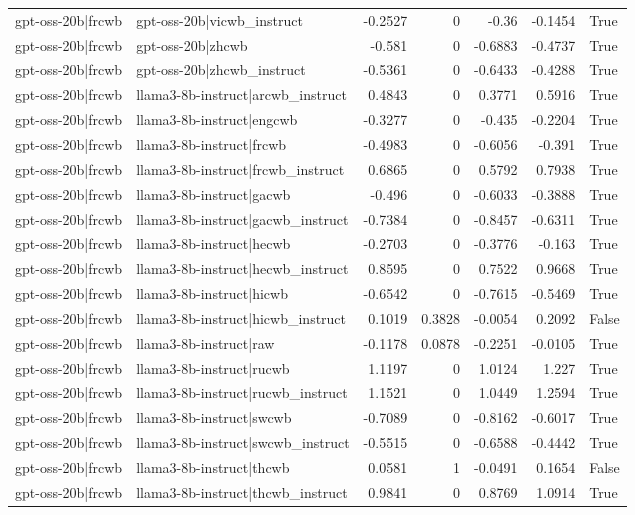 \begin{table}
\begin{tabular}{l l r r r r l}
gpt-oss-20b|frcwb & gpt-oss-20b|vicwb_instruct & -0.2527 & 0 & -0.36 & -0.1454 & True \\
gpt-oss-20b|frcwb & gpt-oss-20b|zhcwb & -0.581 & 0 & -0.6883 & -0.4737 & True \\
gpt-oss-20b|frcwb & gpt-oss-20b|zhcwb_instruct & -0.5361 & 0 & -0.6433 & -0.4288 & True \\
gpt-oss-20b|frcwb & llama3-8b-instruct|arcwb_instruct & 0.4843 & 0 & 0.3771 & 0.5916 & True \\
gpt-oss-20b|frcwb & llama3-8b-instruct|engcwb & -0.3277 & 0 & -0.435 & -0.2204 & True \\
gpt-oss-20b|frcwb & llama3-8b-instruct|frcwb & -0.4983 & 0 & -0.6056 & -0.391 & True \\
gpt-oss-20b|frcwb & llama3-8b-instruct|frcwb_instruct & 0.6865 & 0 & 0.5792 & 0.7938 & True \\
gpt-oss-20b|frcwb & llama3-8b-instruct|gacwb & -0.496 & 0 & -0.6033 & -0.3888 & True \\
gpt-oss-20b|frcwb & llama3-8b-instruct|gacwb_instruct & -0.7384 & 0 & -0.8457 & -0.6311 & True \\
gpt-oss-20b|frcwb & llama3-8b-instruct|hecwb & -0.2703 & 0 & -0.3776 & -0.163 & True \\
gpt-oss-20b|frcwb & llama3-8b-instruct|hecwb_instruct & 0.8595 & 0 & 0.7522 & 0.9668 & True \\
gpt-oss-20b|frcwb & llama3-8b-instruct|hicwb & -0.6542 & 0 & -0.7615 & -0.5469 & True \\
gpt-oss-20b|frcwb & llama3-8b-instruct|hicwb_instruct & 0.1019 & 0.3828 & -0.0054 & 0.2092 & False \\
gpt-oss-20b|frcwb & llama3-8b-instruct|raw & -0.1178 & 0.0878 & -0.2251 & -0.0105 & True \\
gpt-oss-20b|frcwb & llama3-8b-instruct|rucwb & 1.1197 & 0 & 1.0124 & 1.227 & True \\
gpt-oss-20b|frcwb & llama3-8b-instruct|rucwb_instruct & 1.1521 & 0 & 1.0449 & 1.2594 & True \\
gpt-oss-20b|frcwb & llama3-8b-instruct|swcwb & -0.7089 & 0 & -0.8162 & -0.6017 & True \\
gpt-oss-20b|frcwb & llama3-8b-instruct|swcwb_instruct & -0.5515 & 0 & -0.6588 & -0.4442 & True \\
gpt-oss-20b|frcwb & llama3-8b-instruct|thcwb & 0.0581 & 1 & -0.0491 & 0.1654 & False \\
gpt-oss-20b|frcwb & llama3-8b-instruct|thcwb_instruct & 0.9841 & 0 & 0.8769 & 1.0914 & True \\

\end{tabular}
\end{table}
